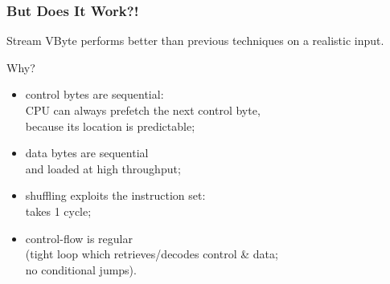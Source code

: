 \begin{frame}
\frametitle{But Does It Work?!}

\vspace*{-1em}
\begin{changemargin}{1cm}
Stream VByte performs better than previous techniques on a realistic input.


Why?

\begin{itemize}
\item control bytes are sequential:\\
\hspace*{1em} CPU can always prefetch the next control byte, \\
\hspace*{1em} because
its location is predictable;
\item data bytes are sequential \\
\hspace*{1em}and loaded at high throughput;
\item shuffling exploits the instruction set: \\
\hspace*{1em}takes 1 cycle;
\item control-flow is regular \\
\hspace*{1em}(tight loop which retrieves/decodes control
\& data;\\
\hspace*{1em}no conditional jumps).
\end{itemize}
\end{changemargin}
\end{frame}






